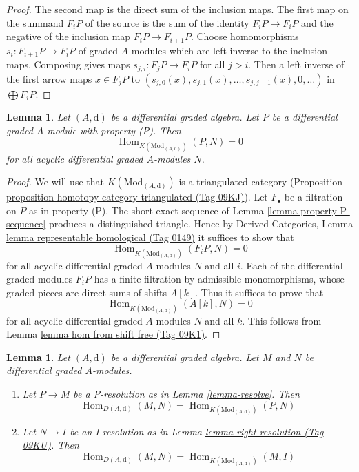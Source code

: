 \documentclass{amsart}
\theoremstyle{plain}
\newtheorem{lemma}[subsection]{Lemma}
\theoremstyle{definition}
\theoremstyle{remark}
\numberwithin{equation}{subsection}
\def\Hom{\mathop{\mathrm{Hom}}\nolimits}
\begin{document}
\begin{proof}
The second map is the direct sum of the inclusion maps.
The first map on the summand $F_iP$ of the source is the sum
of the identity $F_iP \to F_iP$ and the negative of the inclusion
map $F_iP \to F_{i + 1}P$. Choose homomorphisms $s_i : F_{i + 1}P \to F_iP$
of graded $A$-modules which are left inverse to the inclusion maps.
Composing gives maps $s_{j, i} : F_jP \to F_iP$ for all $j > i$.
Then a left inverse of the first arrow maps $x \in F_jP$ to
$(s_{j, 0}(x), s_{j, 1}(x), \ldots, s_{j, j - 1}(x), 0, \ldots)$
in $\bigoplus F_iP$.
\end{proof}


\begin{lemma}
\label{lemma-property-P-K-projective}
Let $(A, \text{d})$ be a differential graded algebra.
Let $P$ be a differential graded $A$-module with property (P).
Then
$$
\Hom_{K(\text{Mod}_{(A, \text{d})})}(P, N) = 0
$$
for all acyclic differential graded $A$-modules $N$.
\end{lemma}

\begin{proof}
We will use that $K(\text{Mod}_{(A, \text{d})})$ is a triangulated
category (Proposition \href{https://stacks.math.columbia.edu/tag/09KJ}{proposition homotopy category triangulated (Tag 09KJ)}).
Let $F_\bullet$ be a filtration on $P$ as in property (P).
The short exact sequence of Lemma \ref{lemma-property-P-sequence}
produces a distinguished triangle. Hence by
Derived Categories, Lemma \href{https://stacks.math.columbia.edu/tag/0149}{lemma representable homological (Tag 0149)}
it suffices to show that
$$
\Hom_{K(\text{Mod}_{(A, \text{d})})}(F_iP, N) = 0
$$
for all acyclic differential graded $A$-modules $N$ and all $i$.
Each of the differential graded modules $F_iP$ has a finite filtration
by admissible monomorphisms, whose graded pieces are direct sums
of shifts $A[k]$. Thus it suffices to prove that
$$
\Hom_{K(\text{Mod}_{(A, \text{d})})}(A[k], N) = 0
$$
for all acyclic differential graded $A$-modules $N$ and all $k$.
This follows from Lemma \href{https://stacks.math.columbia.edu/tag/09K1}{lemma hom from shift free (Tag 09K1)}.
\end{proof}


\begin{lemma}
\label{lemma-hom-derived}
Let $(A, \text{d})$ be a differential graded algebra.
Let $M$ and $N$ be differential graded $A$-modules.
\begin{enumerate}
\item Let $P \to M$ be a P-resolution as in
Lemma \ref{lemma-resolve}. Then
$$
\Hom_{D(A, \text{d})}(M, N) =
\Hom_{K(\text{Mod}_{(A, \text{d})})}(P, N)
$$
\item Let $N \to I$ be an I-resolution as in
Lemma \href{https://stacks.math.columbia.edu/tag/09KU}{lemma right resolution (Tag 09KU)}. Then
$$
\Hom_{D(A, \text{d})}(M, N) =
\Hom_{K(\text{Mod}_{(A, \text{d})})}(M, I)
$$
\end{enumerate}
\end{lemma}
\end{document}
